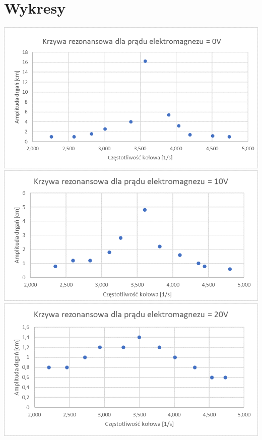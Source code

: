 \documentclass[]{article}
\begin{document}
	\section{Wykresy}
	\includegraphics[width=\linewidth]{wykres1}
	\includegraphics[width=\linewidth]{wykres2}
	\includegraphics[width=\linewidth]{wykres3}
\end{document}
